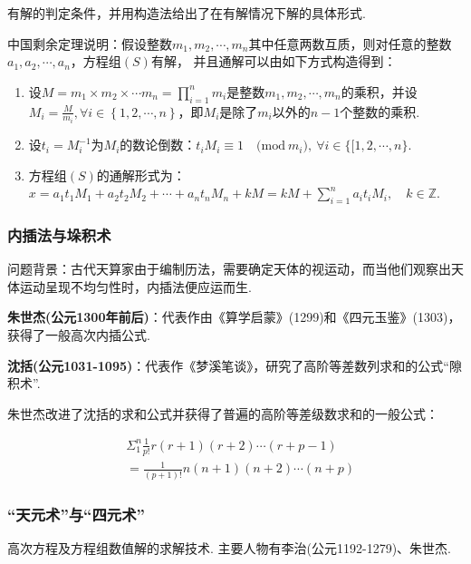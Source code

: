 \documentclass{Math_Note}
\begin{document}
有解的判定条件，并用构造法给出了在有解情况下解的具体形式.

中国剩余定理说明：假设整数$m_{1},m_{2},\cdots,m_{n}$其中任意两数互质，则对任意的整数$a_{1},a_{2},\cdots,a_{n}$，方程组$\left(S\right)$有解，
并且通解可以由如下方式构造得到：

\begin{enumerate}
    \item 设$M=m_{1}\times m_{2}\times\cdots m_{n}=\prod_{i=1}^{n}m_{i}$是整数$m_{1},m_{2},\cdots,m_{n}$的乘积，并设
    $M_{i}=\frac{M}{m_{i}}, \forall i \in \left\{1,2,\cdots,n\right\}$，即$M_{i}$是除了$m_{i}$以外的$n-1$个整数的乘积.
    \item 设$t_{i}=M_{i}^{-1}$为$M_{i}$的数论倒数：$t_{i}M_{i}\equiv1{\quad}\mathrm{{(mod~}}m_{i}\mathrm{{),~}}{\forall i\in\{\![1,2,\cdots,n\}}$.
    \item 方程组$\left(S\right)$的通解形式为：$x=a_{1}t_{1}M_{1}+a_{2}t_{2}M_{2}+\cdots+a_{n}t_{n}M_{n}+k M=k M+\sum_{i=1}^{n}a_{i}t_{i}M_{i},\quad k\in\mathbb{Z}$.
\end{enumerate}

\subsubsection{内插法与垛积术}
问题背景：古代天算家由于编制历法，需要确定天体的视运动，而当他们观察出天体运动呈现不均匀性时，内插法便应运而生. 

\textbf{朱世杰(公元1300年前后)}：代表作由《算学启蒙》(1299)和《四元玉鉴》(1303)，获得了一般高次内插公式.

\textbf{沈括(公元1031-1095)}：代表作《梦溪笔谈》，研究了高阶等差数列求和的公式“隙积术”.

朱世杰改进了沈括的求和公式并获得了普遍的高阶等差级数求和的一般公式：

\begin{equation}
    \begin{split}
        &\Sigma_{1}^{n} \frac{1}{p!}r\left(r+1\right)\left(r+2\right)\cdots\left(r+p-1\right) \\ 
        &= \frac{1}{(p+1)!}n\left(n+1\right)\left(n+2\right)\cdots\left(n+p\right)
    \end{split}
\end{equation}

\subsubsection{“天元术”与“四元术”}
高次方程及方程组数值解的求解技术. 主要人物有李治(公元1192-1279)、朱世杰.
\end{document}
